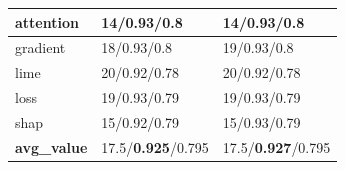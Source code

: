 \begin{table}[H]
\begin{minipage}[t]{0.49\textwidth}
{\begin{tabularx}{\textwidth}{|l|X|X|}
        \hline
         attention & 14/0.93/0.8  & 14/0.93/0.8  \\
        \hline
         gradient  & 18/0.93/0.8  & 19/0.93/0.8  \\
        \hline
         lime      & 20/0.92/0.78 & 20/0.92/0.78 \\
        \hline
         loss      & 19/0.93/0.79 & 19/0.93/0.79 \\
        \hline
         shap      & 15/0.92/0.79 & 15/0.93/0.79 \\
        \hline
         \textbf{avg\_value} & 17.5/\textbf{0.925}/0.795 & 17.5/\textbf{0.927}/0.795 \\
        \hline
    \end{tabularx}
    }
  \end{minipage}
\end{table}

